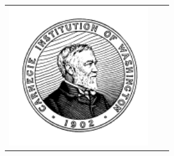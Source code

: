 \documentclass[landscape,a0b,final]{a0poster}
\begin{document}
\begin{center}
\begin{minipage}[c][9cm][c]{0.1\textwidth}
\begin{center}
\begin{tabular}{ccc}
    \includegraphics[height=6cm,angle=0]{carnegie.png} 
    \end{tabular}
  \end{center}
\end{minipage}
\end{center}


\vspace*{1cm}
\end{document}
